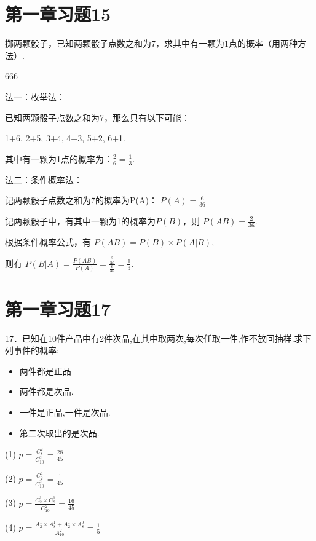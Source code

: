 \documentclass[twoside]{article}
\begin{document}
\section{第一章习题15}

掷两颗骰子，已知两颗骰子点数之和为7，求其中有一颗为1点的概率（用两种方法）.

\begin{ans}{15}{666}

    法一：枚举法：

    已知两颗骰子点数之和为7，那么只有以下可能：

    1+6, 2+5, 3+4, 4+3, 5+2, 6+1.

    其中有一颗为1点的概率为：\( \frac{2}{6} = \frac{1}{3} \).

    法二：条件概率法：

    记两颗骰子点数之和为7的概率为P(A)：
    \( P(A) = \frac{6}{36} \) 

    记两颗骰子中，有其中一颗为1的概率为$P(B)$，则 $ P(AB) = \frac{2}{36}$.

    根据条件概率公式，有 $P(AB) = P(B) \times P(A|B)$,

    则有 $ P(B|A) = \frac{P(AB)}{P(A)} = \frac{\frac{2}{36}}{\frac{6}{36}} = \frac{1}{3}$.
\end{ans}

\section{第一章习题17}

17．已知在10件产品中有2件次品,在其中取两次,每次任取一件,作不放回抽样.求下列事件的概率:

\begin{itemize}
    \item 两件都是正品
    \item 两件都是次品.
    \item 一件是正品,一件是次品.
    \item 第二次取出的是次品.
\end{itemize}

\begin{ans}{17}{17}
    
    (1) \( p = \frac{C_{8}^{2}}{C_{10}^{2}} = \frac{28}{45}\)

    (2) \( p = \frac{C_{2}^{2}}{C_{10}^{2}} = \frac{1}{45}\)

    (3) \( p = \frac{C_{2}^{1} \times C_{8}^{1}}{C_{10}^{2}} = \frac{16}{45}\)

    (4) \( p = \frac{A_{2}^{1} \times A_{8}^{1} + A_{2}^{1} \times A_{8}^{0}}{A_{10}^{2}} = \frac{1}{5} \)
\end{ans}
\end{document}
